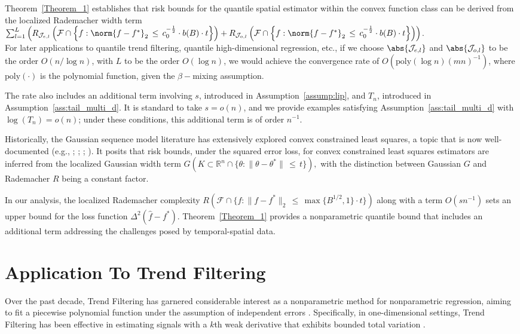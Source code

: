 \documentclass[twoside,11pt]{article}
\newcommand{\rev}[1]{{\color{revisionred}#1}}
\begin{document}
Theorem~\ref{Theorem_1} establishes that risk bounds for the quantile spatial estimator within the convex function class can be derived from the localized Rademacher width term \\ $\sum_{l=1}^L \left(R_{\mathcal{J}_{e,l}}\left(\mathcal{F}\cap \left\{f: \norm{f-f^*}_2\,\leq\, c_0^{-\frac{1}{2}}\cdot b(B)\cdot t\right\}\right) + R_{\mathcal{J}_{o,l}}\left(\mathcal{F}\cap \left\{f: \norm{f-f^*}_2\,\leq\, c_0^{-\frac{1}{2}}\cdot b(B)\cdot t\right\}\right) \right)$. \\ For later applications to quantile trend filtering, quantile high-dimensional regression, etc., if we choose $\abs{\mathcal{J}_{e,l}}$ and $\abs{\mathcal{J}_{o,l}}$ to be the order $O(n/\log n)$, with $L$ to be the order $O(\log n)$, we would achieve the convergence rate of \rev{$O(\text{poly}(\log n)(mn)^{-1})$}, where $\text{poly}(\cdot)$ is the polynomial function, given the $\beta-$mixing assumption. 

\rev{The rate also includes an additional term involving $s$, introduced in Assumption~\ref{assump:lip}, and $T_n$, introduced in Assumption~\ref{ass:tail_multi_d}. It is standard to take $s=o(n)$, and we provide examples satisfying Assumption~\ref{ass:tail_multi_d} with $\log(T_n)=o(n)$; under these conditions, this additional term is of order \(n^{-1}\).}

Historically, the Gaussian sequence model literature has extensively explored convex constrained least squares, a topic that is now well-documented (e.g., \cite{van1990estimating}; \cite{wellner2013weak}; \cite{hjort2011asymptotics}; \cite{chatterjee2015risk}). It posits that risk bounds, under the squared error loss, for convex constrained least squares estimators are inferred from the localized Gaussian width term $G(K \subset \mathbb{R}^n \cap \{ \theta : \|\theta - \theta^*\| \,\leq\, t\}),$ with the distinction between Gaussian \(G\) and Rademacher \(R\) being a constant factor.

In our analysis, the localized Rademacher complexity \(R(\mathcal{F} \cap \{ f : \|f - f^*\|_2 \,\leq\, \max\{B^{1/2},1\}\cdot t\})\) along with a term \(O(sn^{-1})\) sets an upper bound for the loss function \(\Delta^2(\hat{f} - f^*)\). Theorem~\ref{Theorem_1} provides a nonparametric quantile bound that includes an additional term addressing the challenges posed by temporal-spatial data.







\section{Application To Trend Filtering}
Over the past decade, Trend Filtering has garnered considerable interest as a nonparametric method for nonparametric regression, aiming to fit a piecewise polynomial function under the assumption of independent errors \cite{rudin1992nonlinear, mammen1997locally, tibshirani2005sparsity, kim2009ell_1}. Specifically, in one-dimensional settings, Trend Filtering has been effective in estimating signals with a $k$th weak derivative that exhibits bounded total variation \cite{tibshirani2014adaptive}.
\end{document}
